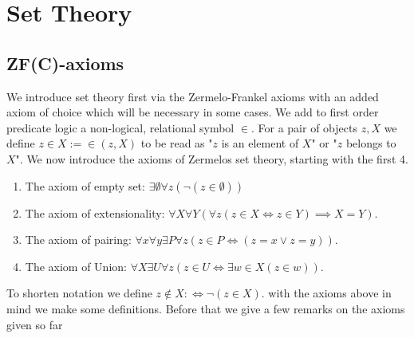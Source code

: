 \section{Set Theory}
\subsection{ZF(C)-axioms}

We introduce set theory first via the Zermelo-Frankel axioms with an added axiom of choice which will be necessary in some cases. We add to first order predicate logic a non-logical, relational symbol $\in$. For a pair of objects $z,X$ we define $z\in X :=  \in(z,X)$ to be read as "$z$ is an element of $X$" or "$z$ belongs to $X$". We now introduce the axioms of Zermelos set theory, starting with the first 4. 
\begin{axioms}
    \begin{enumerate}\addtocounter{enumi}{-1}
        \item The axiom of empty set: $\exists \emptyset\forall z(\neg(z\in \emptyset))$
        \item The axiom of extensionality: $\forall X\forall Y(\forall z(z\in X \iff z \in Y)\implies X=Y)$.
        \item The axiom of pairing: $\forall x\forall y\exists P \forall z\left(z\in P \iff \left(z = x \vee z = y\right)\right)$.
        \item The axiom of Union: $\forall X\exists U \forall z ( z \in U \iff \exists w \in X(z\in w))$.
    \end{enumerate}
\end{axioms}
To shorten notation we define $z\notin X :\iff \neg(z\in X)$. with the axioms above in mind we make some definitions. Before that we give a few remarks on the axioms given so far
